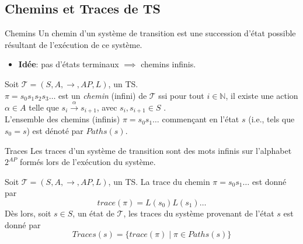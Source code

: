 \documentclass[compress]{beamer}
\begin{document}
\subsection{Chemins et Traces de TS}
\begin{frame}{Chemins}
Un chemin d'un système de transition est une succession d'état possible résultant de l'exécution de ce système.
\begin{itemize}
  \item \textbf{\color{fibeamer@orange}Idée}: pas d'états terminaux $\implies$
    chemins infinis.
\end{itemize}
\begin{definition}[Chemin d'un TS]
  Soit $\mathcal{T} = (S, A, \rightarrow, AP, L)$, un TS. \\
  $\pi = s_0 s_1 s_2 s_3 \dots$ est un \textit{chemin} (infini) de $\mathcal{T}$ ssi
  pour tout $i \in \mathbb{N}$, il existe une action $\alpha \in A$ telle que
  $s_i \xrightarrow{\alpha} s_{i+1}$, avec $s_i, s_{i+1} \in S$%
  . \\
  L'ensemble des chemins (infinis) $\pi = s_0s_1\dots$ commençant en l'état $s$ (i.e., tels que $s_0 = s$) est dénoté par $Paths(s)$.

\end{definition}

\end{frame}

\begin{frame}{Traces}
    Les traces d'un système de transition sont des mots infinis sur l'alphabet $2^{AP}$ formés lors de l'exécution du système. \\
\begin{definition}[Traces]
  Soit $\mathcal{T} = (S, A, \rightarrow, AP, L)$, un TS. La trace du chemin $\pi = s_0s_1 \dots$ est donné par \[trace(\pi) = L(s_0)L(s_1)\dots\]
  Dès lors, soit $s \in S$, un état de $\mathcal{T}$, les traces du système
  provenant de l'état $s$ est donné par \[Traces(s) = \{ trace(\pi) \; | \; \pi \in
  Paths(s) \}\]
\end{definition}
\end{frame}
\end{document}
